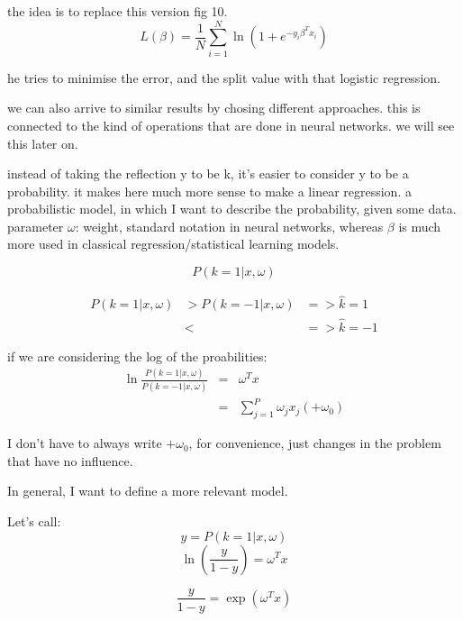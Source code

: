 \documentclass[a4paper]{tufte-book}
\newcommand{\nth}{\frac{1}{N}}
\newcommand{\sumin}{\sum_{i=1}^N}
\begin{document}
the idea is to replace this version
fig 10.
\begin{equation}
    L(\beta) = \nth \sumin \ln (1+e^{-y_i \beta^T x_i} )
\end{equation}

he tries to minimise the error, and the split value with  that logistic regression.

we can also arrive to similar results by chosing different approaches.
this is connected to the kind of operations that are done in neural networks.
we will see this later on.

instead of taking the reflection y to be k, it's easier to consider y to be
a probability. it makes here much more sense to make a linear regression.
a probabilistic model, in which I want to describe the probability, given some data.
parameter $\omega$: weight, standard notation in neural networks, whereas $\beta$ is
much more used in classical regression/statistical learning models.

\begin{equation}
    P(k=1 | x,\omega)
\end{equation}

\begin{eqnarray}
    P(k=1|x,\omega ) & >  P(k=-1|x,\omega) & => \hat k = 1 \\
    & <      &  => \hat k = -1
\end{eqnarray}


if we are considering the log of the proabilities:
\begin{eqnarray}
    \ln \frac{P(k=1|x,\omega)}{P(k=-1|x,\omega)} & = & \omega^T x\\
    & = &  \sum_{j=1}^P \omega_j x_j (+\omega_0)
\end{eqnarray}


I don't have to always write $+\omega_0$, for convenience, just changes in the
problem that have no influence.

In general, I want to define a more relevant model.

Let's call:
\begin{equation}
    y=P(k=1|x,\omega)
\end{equation}
\begin{equation}
    \ln (\frac{y}{1-y}) = \omega^T x
\end{equation}

\begin{equation}
    \frac{y}{1-y} = \exp (\omega^T x)
\end{equation}
\end{document}

